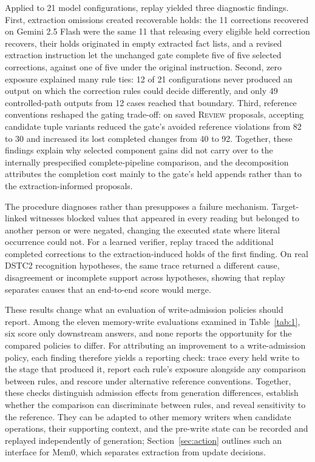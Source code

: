 \documentclass[acmsmall,review,anonymous]{acmart}
\newcommand{\review}{\textsc{Review}}
\begin{document}
Applied to 21 model configurations, replay yielded three diagnostic findings. First, extraction omissions created recoverable holds: the 11 corrections recovered on Gemini 2.5 Flash were the same 11 that releasing every eligible held correction recovers, their holds originated in empty extracted fact lists, and a revised extraction instruction let the unchanged gate complete five of five selected corrections, against one of five under the original instruction. Second, zero exposure explained many rule ties: 12 of 21 configurations never produced an output on which the correction rules could decide differently, and only 49 controlled-path outputs from 12 cases reached that boundary. Third, reference conventions reshaped the gating trade-off: on saved \review{} proposals, accepting candidate tuple variants reduced the gate's avoided reference violations from 82 to 30 and increased its lost completed changes from 40 to 92. Together, these findings explain why selected component gains did not carry over to the internally prespecified complete-pipeline comparison, and the decomposition attributes the completion cost mainly to the gate's held appends rather than to the extraction-informed proposals.

The procedure diagnoses rather than presupposes a failure mechanism. Target-linked witnesses blocked values that appeared in every reading but belonged to another person or were negated, changing the executed state where literal occurrence could not. For a learned verifier, replay traced the additional completed corrections to the extraction-induced holds of the first finding. On real DSTC2 recognition hypotheses, the same trace returned a different cause, disagreement or incomplete support across hypotheses, showing that replay separates causes that an end-to-end score would merge.

These results change what an evaluation of write-admission policies should report. Among the eleven memory-write evaluations examined in Table~\ref{tab:1}, six score only downstream answers, and none reports the opportunity for the compared policies to differ. For attributing an improvement to a write-admission policy, each finding therefore yields a reporting check: trace every held write to the stage that produced it, report each rule's exposure alongside any comparison between rules, and rescore under alternative reference conventions. Together, these checks distinguish admission effects from generation differences, establish whether the comparison can discriminate between rules, and reveal sensitivity to the reference. They can be adapted to other memory writers when candidate operations, their supporting context, and the pre-write state can be recorded and replayed independently of generation; Section~\ref{sec:action} outlines such an interface for Mem0, which separates extraction from update decisions.
\end{document}
